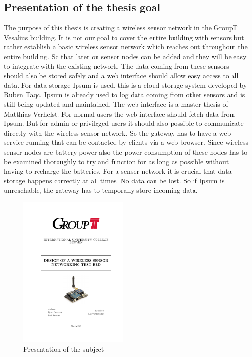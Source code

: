 \subsection{Presentation of the thesis goal}
The purpose of this thesis is creating a wireless sensor network in the GroupT Vesalius building. It is not our goal to cover the entire building with sensors but rather establish a basic wireless sensor network which reaches out throughout the entire building. So that later on sensor nodes can be added and they will be easy to integrate with the existing network. The data coming from these sensors should also be stored safely and a web interface should allow easy access to all data. For data storage Ipsum is used, this is a cloud storage system developed by Ruben Taqc. Ipsum is already used to log data coming from other sensors and is still being updated and maintained. The web interface is a master thesis of Matthias Verhelst. For normal users the web interface should fetch data from Ipsum. But for admin or privileged users it should also possible to communicate directly with the wireless sensor network. So the gateway has to have a web service running that can be contacted by clients via a web browser. Since wireless sensor nodes are battery power also the power consumption of these nodes has to be examined thoroughly to try and function for as long as possible without having to recharge the batteries. For a sensor network it is crucial that data storage happens correctly at all times. No data can be lost. So if Ipsum is unreachable, the gateway has to temporally store incoming data.
\begin{figure}[htbp]
\centering
\includegraphics[width=0.48\textwidth]{thesis}
\caption{Presentation of the subject}
\label{fig:thesis}
\end{figure} 

